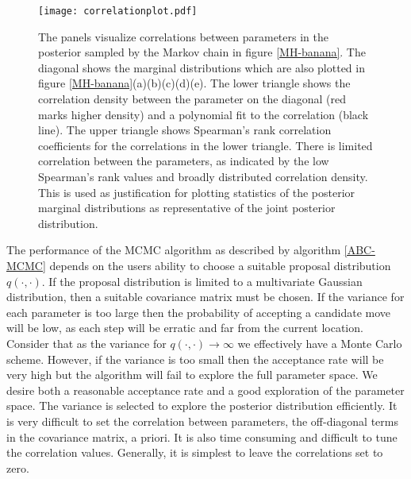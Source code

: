 \begin{figure}[H]
	\centering
	\texttt{[image: correlationplot.pdf]}
	\caption{The panels visualize correlations between parameters in the posterior sampled by the Markov chain in figure \ref{MH-banana}. The diagonal shows the marginal distributions which are also plotted in figure \ref{MH-banana}(a)(b)(c)(d)(e). The lower triangle shows the correlation density between the parameter on the diagonal (red marks higher density) and a polynomial fit to the correlation (black line). The upper triangle shows Spearman's rank correlation coefficients for the correlations in the lower triangle. There is limited correlation between the parameters, as indicated by the low Spearman's rank values and broadly distributed correlation density. This is used as justification for plotting statistics of the posterior marginal distributions as representative of the joint posterior distribution.}
	\label{correlation-plot}
\end{figure}

The performance of the MCMC algorithm as described by algorithm \ref{ABC-MCMC} depends on the users ability to choose a suitable proposal distribution $q(\cdot,\cdot)$. If the proposal distribution is limited to a multivariate Gaussian distribution, then a suitable covariance matrix must be chosen. If the variance for each parameter is too large then the probability of accepting a candidate move will be low, as each step will be erratic and far from the current location. Consider that as the variance for $q(\cdot,\cdot) \rightarrow \infty$ we effectively have a Monte Carlo scheme. However, if the variance is too small then the acceptance rate will be very high but the algorithm will fail to explore the full parameter space. We desire both a reasonable acceptance rate and a good exploration of the parameter space. The variance is selected to explore the posterior distribution efficiently. It is very difficult to set the correlation between parameters, the off-diagonal terms in the covariance matrix, a priori. It is also time consuming and difficult to tune the correlation values. Generally, it is simplest to leave the correlations set to zero. \par

